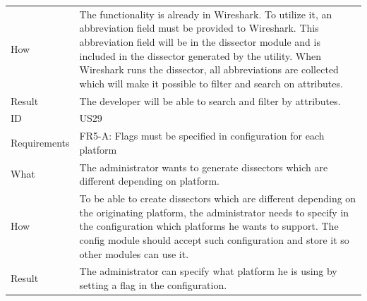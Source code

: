 \begin{table}[htbp]
{\begin{tabularx}{1.2\textwidth}{l X}
	How & The functionality is already in Wireshark. To utilize it, an abbreviation field must be provided to Wireshark. This abbreviation field will be in the dissector module
	and is included in the dissector generated by the utility. When Wireshark runs the dissector, all abbreviations are collected which will make it possible to filter and search
	on attributes. \\
	Result & The developer will be able to search and filter by attributes. \\
	\midrule
	ID & US29 \\
	Requirements & FR5-A: Flags must be specified in configuration for each platform \\
	What & The administrator wants to generate dissectors which are different depending on platform. \\
	How & To be able to create dissectors which are different depending on the originating platform, the administrator needs to specify in the configuration which platforms he wants to support.
	The config module should accept such configuration and store it so other modules can use it. \\ 
	Result & The administrator can specify what platform he is using by setting a flag in the configuration. \\
	\midrule
\end{tabularx}}
\end{table}


